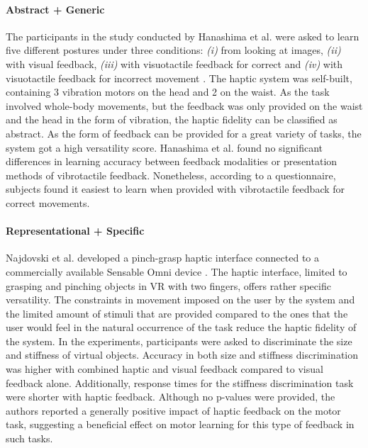 \paragraph{Abstract + Generic} \label{sec:abstractgeneric}
The participants in the study conducted by Hanashima et al. were asked to learn five different postures under three conditions: \textit{(i)} from looking at images, \textit{(ii)} with visual feedback, \textit{(iii)} with visuotactile feedback for correct and \textit{(iv)} with visuotactile feedback for incorrect movement \cite{Hanashima2023}. The haptic system was self-built, containing 3 vibration motors on the head and 2 on the waist. As the task involved whole-body movements, but the feedback was only provided on the waist and the head in the form of vibration, the haptic fidelity can be classified as abstract. As the form of feedback can be provided for a great variety of tasks, the system got a high versatility score. 
Hanashima et al. found no significant differences in learning accuracy between feedback modalities or presentation methods of vibrotactile feedback. Nonetheless, according to a questionnaire, subjects found it easiest to learn when provided with vibrotactile feedback for correct movements.


\paragraph{Representational + Specific} \label{sec:representationalspecific}
Najdovski et al. developed a pinch-grasp haptic interface connected to a commercially available Sensable Omni device \cite{Najdovski2020}. The haptic interface, limited to grasping and pinching objects in VR with two fingers, offers rather specific versatility. The constraints in movement imposed on the user by the system and the limited amount of stimuli that are provided compared to the ones that the user would feel in the natural occurrence of the task reduce the haptic fidelity of the system. 
In the experiments, participants were asked to discriminate the size and stiffness of virtual objects. Accuracy in both size and stiffness discrimination was higher with combined haptic and visual feedback compared to visual feedback alone. Additionally, response times for the stiffness discrimination task were shorter with haptic feedback. Although no p-values were provided, the authors reported a generally positive impact of haptic feedback on the motor task, suggesting a beneficial effect on motor learning for this type of feedback in such tasks. 



